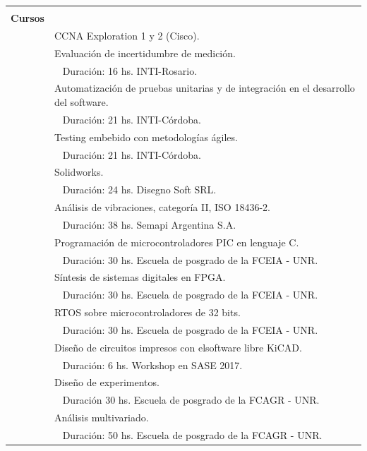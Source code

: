 \documentclass[a4paper,10pt, sans]{article}
\begin{document}
\begin{table}[H]
\begin{tabularx}{\textwidth}{r X}  
 \hline \\
    \textbf{Cursos} & {} \\ [1ex]
      {} & CCNA Exploration 1 y 2 (Cisco). \\ 
      {} & Evaluación de incertidumbre de medición. \\
      {} & ~ Duración: 16 hs. INTI-Rosario. \\ 
      {} & Automatización de pruebas unitarias y de integración en el desarrollo del software. \\
      {} &   ~ Duración: 21 hs. INTI-Córdoba. \\ 
      {} & Testing embebido con metodologías ágiles. \\
      {} &   ~ Duración: 21 hs. INTI-Córdoba. \\ 
      {} & Solidworks. \\
      {} &  ~ Duración: 24 hs. Disegno Soft SRL. \\ 
      {} & Análisis de vibraciones, categoría II, ISO 18436-2. \\
      {} & ~ Duración: 38 hs. Semapi Argentina S.A. \\ 
      {} & Programación de microcontroladores PIC en lenguaje C. \\
      {} & ~ Duración: 30 hs. Escuela de posgrado de la FCEIA - UNR. \\
      {} & Síntesis de sistemas digitales en FPGA. \\
      {} & ~ Duración: 30 hs. Escuela de posgrado de la FCEIA - UNR. \\
      {} & RTOS sobre microcontroladores de 32 bits. \\
      {} & ~ Duración: 30 hs. Escuela de posgrado de la FCEIA - UNR. \\
      {} & Diseño​ ​de​ ​circuitos​ ​impresos​ ​con​ ​el​ ​software​ ​libre​ ​KiCAD. \\
      {} & ~ Duración: 6 hs. Workshop en SASE 2017. \\
      {} & Diseño de experimentos. \\
      {} & ~ Duración 30 hs. Escuela de posgrado de la FCAGR - UNR. \\
      {} & Análisis multivariado. \\
      {} & ~ Duración: 50 hs. Escuela de posgrado de la FCAGR - UNR. \\

\end{tabularx}
\end{table}
\end{document}
